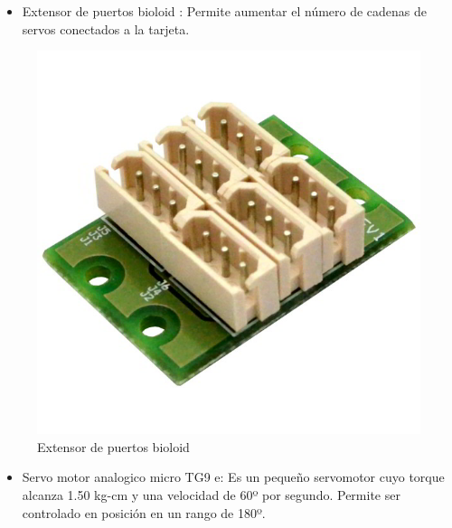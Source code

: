 \begin{itemize}
\item Extensor de puertos bioloid : Permite aumentar el número de cadenas de servos conectados a la tarjeta. 


\end{itemize}


\begin{figure}[hbtp]

\centering
\includegraphics[scale=0.3]{imagenes/Dynamixel-AX-MX-6-Port-Extension-Hub-600x600.jpg}
\caption{Extensor de puertos bioloid  }
\end{figure}


\begin{itemize}
\item Servo motor analogico micro TG9 e: Es un pequeño servomotor cuyo torque alcanza 1.50 kg-cm y una velocidad de 60º por segundo. Permite ser controlado en posición en un rango de 180º. 


\end{itemize}


